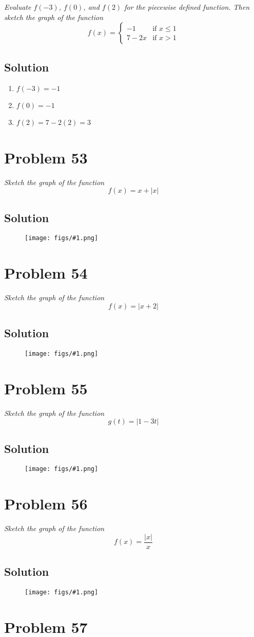 \documentclass[11pt]{article}
\newcommand{\soln}{\subsection*}
\newcommand{\qn}{\textit}
\newcommand{\imgsoln}[1]{
	\begin{figure}[h]
		\centering
		\texttt{[image: figs/\#1.png]}
	\end{figure}
}
\begin{document}
\qn{Evaluate $f(-3)$, $f(0)$, and $f(2)$ for the piecewise defined function. Then sketch the graph of the function}
\begin{equation}
	f(x)=
	\begin{cases}
		-1 & \text{if } x \le 1\\
		7-2x & \text{if } x > 1
	\end{cases}
\end{equation}

\soln{Solution}
\begin{enumerate}
	\item $f(-3)=-1$
	\item $f(0)=-1$
	\item $f(2)=7-2(2)=3$
\end{enumerate}

\section*{Problem 53}

\qn{Sketch the graph of the function $$f(x)=x+|x|$$}

\soln{Solution}
\imgsoln{1.1.53-ans}

\section*{Problem 54}

\qn{Sketch the graph of the function $$f(x)=|x+2|$$}

\soln{Solution}
\imgsoln{1.1.54-ans}

\section*{Problem 55}

\qn{Sketch the graph of the function $$g(t)=|1-3t|$$}

\soln{Solution}
\imgsoln{1.1.55-ans}

\section*{Problem 56}

\qn{Sketch the graph of the function $$f(x)=\frac{|x|}{x}$$}

\soln{Solution}
\imgsoln{1.1.56-ans}

\section*{Problem 57}
\end{document}
